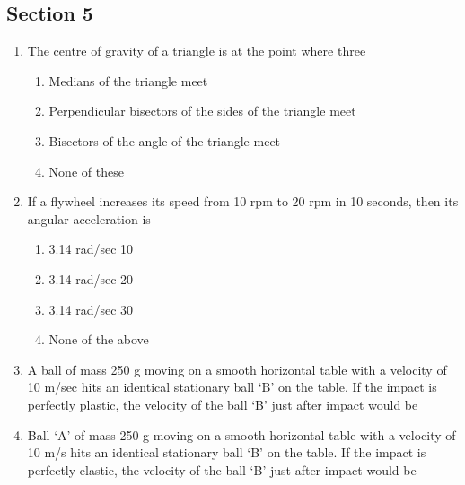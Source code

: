 \documentclass[11pt,a4paper]{article}
\begin{document}
\subsection*{Section 5}
\begin{enumerate}
\item{The centre of gravity of a triangle is at the point where three}
\begin{enumerate}[label=\Alph*.]
\item{Medians of the triangle meet}
\item{Perpendicular bisectors of the sides of the triangle meet}
\item{Bisectors of the angle of the triangle meet}
\item{None of these}
\end{enumerate}
\item{If a flywheel increases its speed from 10 rpm to 20 rpm in 10 seconds, then its angular acceleration is}
\begin{enumerate}[label=\Alph*.]
\item{3.14 rad/sec 10}
\item{3.14 rad/sec 20}
\item{3.14 rad/sec 30}
\item{None of the above}
\end{enumerate}
\item{A ball of mass 250 g moving on a smooth horizontal table with a velocity of 10 m/sec hits an identical stationary ball `B' on the table. If the impact is perfectly plastic, the velocity of the ball `B' just after impact would be
}
\\
\item{Ball `A' of mass 250 g moving on a smooth horizontal table with a velocity of 10 m/s hits an identical stationary ball `B' on the table. If the impact is perfectly elastic, the velocity of the ball `B' just after impact would be
}
\\
\end{enumerate}
\end{document}

